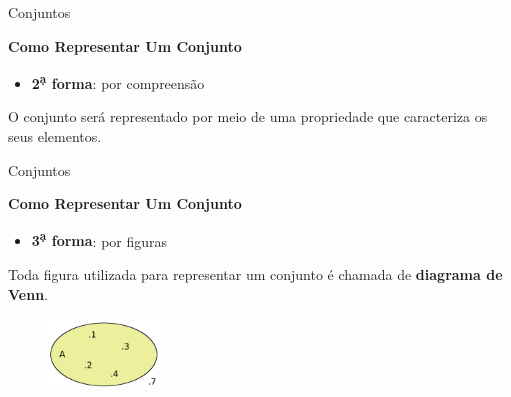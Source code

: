 \documentclass[11pt, openright, a4paper, brazil, english, french, spanish, bibjustif, xcolor=table,aspectratio=169]{beamer}
\begin{document}
     \begin{frame}[t]{Conjuntos}

          \medskip

          \textbf{Como Representar Um Conjunto}

          \medskip

               \begin{minipage}{\columnwidth}

\begin{itemize}

\item \textbf{2\textsuperscript{\d a} forma}: por compreensão

\end{itemize}

O conjunto será representado por meio de uma propriedade que caracteriza os seus elementos.

               \end{minipage}

     \end{frame}
     
     \begin{frame}[t]{Conjuntos}

          \medskip

          \textbf{Como Representar Um Conjunto}

          \medskip

               \begin{minipage}{\columnwidth}

\begin{itemize}

\item \textbf{3\textsuperscript{\d a} forma}: por figuras

\end{itemize}

Toda figura utilizada para representar um conjunto é chamada de \textbf{diagrama de Venn}. 

\pause

\medskip

\begin{minipage}{.4\linewidth}

\begin{figure}[H]
    
    \includegraphics[width=3cm]{diagramadevenn1.png}
   
\end{figure} 

\end{minipage}


               \end{minipage}


     \end{frame}
\end{document}
